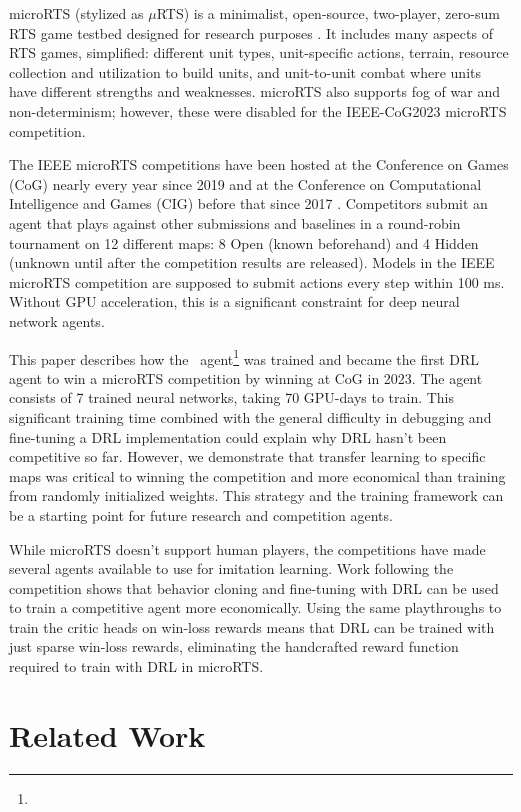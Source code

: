 \documentclass{article}
\begin{document}
microRTS (stylized as $\mu$RTS) is a minimalist, open-source, two-player, zero-sum RTS game testbed designed for research
purposes \citep{Ontan2013TheCM}. It includes many aspects of RTS games, simplified: different unit types, unit-specific
actions, terrain, resource collection and utilization to build units, and unit-to-unit combat
where units have different strengths and weaknesses. microRTS also supports fog of war
and non-determinism; however, these were disabled for the IEEE-CoG2023 microRTS
competition.

The IEEE microRTS competitions have been hosted at the Conference on Games (CoG) nearly
every year since 2019 and at the Conference on Computational Intelligence and Games
(CIG) before that since 2017 \citep{Ontañón_Barriga_Silva_Moraes_Lelis_2018}.
Competitors submit an agent that plays against other submissions and baselines in a round-robin tournament
on 12 different maps: 8 Open (known beforehand) and 4 Hidden (unknown until after the
competition results are released). Models in the IEEE microRTS competition are supposed
to submit actions every step within 100 ms. Without GPU acceleration, this is a significant constraint for deep neural
network agents.

This paper describes how the \agentName\ agent\footnote{\raiMicroRTSGitHubUrl} was
trained and became the first DRL agent to win a microRTS competition by winning at CoG
in 2023. The agent consists of 7 trained neural networks, taking 70
GPU-days to train. This significant training time combined with the general difficulty
in debugging and fine-tuning a DRL implementation could explain why DRL hasn't been
competitive so far. However, we demonstrate that transfer learning to specific maps was
critical to winning the competition and more economical than training from randomly
initialized weights. This strategy and the training framework can be a starting
point for future research and competition agents.

While microRTS doesn't support human players, the competitions have made several agents
available to use for imitation learning. Work following the
competition shows that behavior cloning and fine-tuning with DRL can be used to train a
competitive agent more economically. Using the same playthroughs to train the critic
heads on win-loss rewards means that DRL can be trained with just sparse win-loss
rewards, eliminating the handcrafted reward function required to train with DRL in microRTS.

\section{Related Work}
\end{document}
